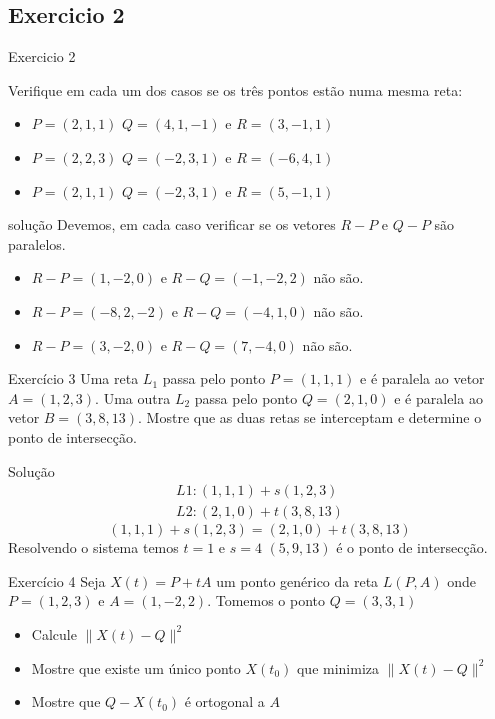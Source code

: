 \documentclass{beamer}
\begin{document}
\subsection{Exercicio 2}

\begin{frame}{Exercicio 2}

Verifique em cada um dos casos se os três pontos estão numa mesma reta:
\begin{itemize}
    \item $P=(2,1,1)$ $Q=(4,1,-1)$ e $R=(3,-1,1)$
    \item $P=(2,2,3)$ $Q=(-2,3,1)$ e $R=(-6,4,1)$
    \item $P=(2,1,1)$ $Q=(-2,3,1)$ e $R=(5,-1,1)$
\end{itemize}

\end{frame}

\begin{frame}{solução}
  Devemos, em cada caso verificar se os vetores $R-P$ e $Q-P$ são paralelos.
  \begin{itemize}
    \item $R-P =(1,-2,0)$ e $R-Q=(-1,-2,2)$ não são.
    \item $R-P =(-8,2,-2)$ e $R-Q=(-4,1,0)$ não são.
    \item $R-P =(3,-2,0)$ e $R-Q=(7,-4,0)$ não são.
  \end{itemize}
\end{frame}

\begin{frame}{Exercício 3}
   Uma reta $L_1$ passa pelo ponto $P=(1,1,1)$ e é paralela ao vetor $A=(1,2,3).$ Uma outra $L_2$ passa pelo ponto $Q=(2,1,0)$ e é paralela ao vetor $B=(3,8,13).$  Mostre que as duas retas se interceptam e determine o ponto de intersecção.
\end{frame}

\begin{frame}{Solução}
  \begin{gather*}
    L1: (1,1,1) + s(1,2,3) \\
    L2: (2,1,0) + t(3,8,13)
  \end{gather*}
$$(1,1,1) + s(1,2,3)= (2,1,0) + t(3,8,13)$$
  Resolvendo o sistema temos 
  $t=1$ e $s=4$
  $(5,9,13)$ é o ponto de intersecção.

\end{frame}

\begin{frame}{Exercício 4}
Seja $X(t) = P + tA$ um ponto genérico da reta $L(P,A)$ onde $P=(1,2,3)$ e $A=(1,-2,2).$ Tomemos o ponto $Q=(3,3,1)$
\begin{itemize}
    \item Calcule $\| X(t) - Q \|^2$
    \item Mostre que existe um único ponto $X(t_0)$ que minimiza $\| X(t) - Q \|^2$
    \item Mostre que $Q-X(t_0)$ é ortogonal a $A$
\end{itemize}
    \end{frame}
\end{document}

